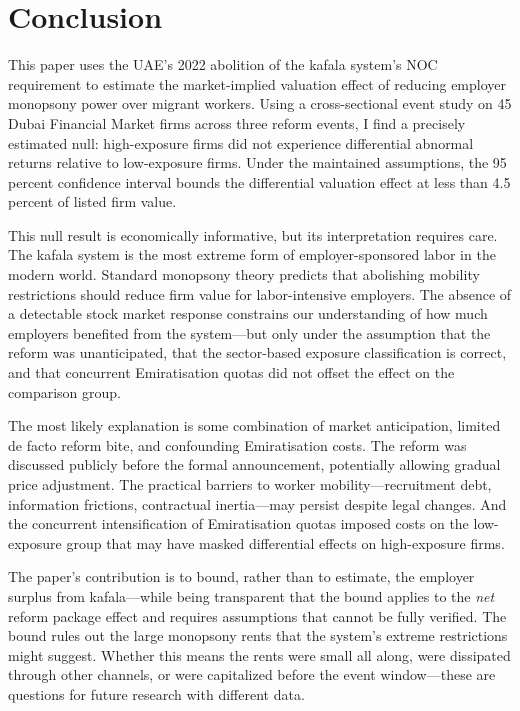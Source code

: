 \documentclass[12pt]{article}
\begin{document}

\section{Conclusion}\label{sec:conclusion}

This paper uses the UAE's 2022 abolition of the kafala system's NOC requirement to estimate the market-implied valuation effect of reducing employer monopsony power over migrant workers. Using a cross-sectional event study on 45 Dubai Financial Market firms across three reform events, I find a precisely estimated null: high-exposure firms did not experience differential abnormal returns relative to low-exposure firms. Under the maintained assumptions, the 95 percent confidence interval bounds the differential valuation effect at less than 4.5 percent of listed firm value.

This null result is economically informative, but its interpretation requires care. The kafala system is the most extreme form of employer-sponsored labor in the modern world. Standard monopsony theory predicts that abolishing mobility restrictions should reduce firm value for labor-intensive employers. The absence of a detectable stock market response constrains our understanding of how much employers benefited from the system---but only under the assumption that the reform was unanticipated, that the sector-based exposure classification is correct, and that concurrent Emiratisation quotas did not offset the effect on the comparison group.

The most likely explanation is some combination of market anticipation, limited de facto reform bite, and confounding Emiratisation costs. The reform was discussed publicly before the formal announcement, potentially allowing gradual price adjustment. The practical barriers to worker mobility---recruitment debt, information frictions, contractual inertia---may persist despite legal changes. And the concurrent intensification of Emiratisation quotas imposed costs on the low-exposure group that may have masked differential effects on high-exposure firms.

The paper's contribution is to bound, rather than to estimate, the employer surplus from kafala---while being transparent that the bound applies to the \emph{net} reform package effect and requires assumptions that cannot be fully verified. The bound rules out the large monopsony rents that the system's extreme restrictions might suggest. Whether this means the rents were small all along, were dissipated through other channels, or were capitalized before the event window---these are questions for future research with different data.
\end{document}
